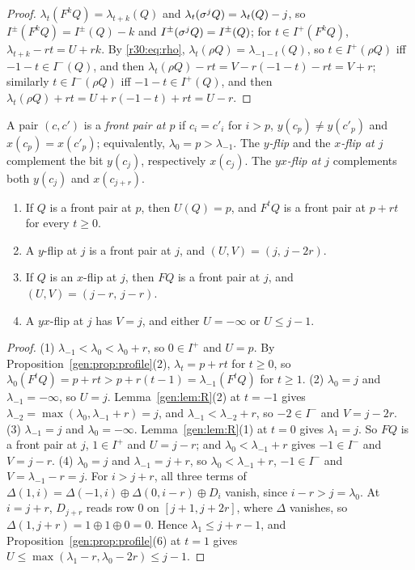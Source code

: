 \begin{proof}
$\lambda_t(F^kQ)=\lambda_{t+k}(Q)$ and $\lambda_t(\sigma^jQ)=\lambda_t(Q)-j$, so $I^\pm(F^kQ)=I^\pm(Q)-k$ and $I^\pm(\sigma^jQ)=I^\pm(Q)$; for $t\in I^+(F^kQ)$, $\lambda_{t+k}-rt=U+rk$. By \eqref{r30:eq:rho}, $\lambda_t(\rho Q)=\lambda_{-1-t}(Q)$, so $t\in I^+(\rho Q)$ iff $-1-t\in I^-(Q)$, and then $\lambda_t(\rho Q)-rt=V-r(-1-t)-rt=V+r$; similarly $t\in I^-(\rho Q)$ iff $-1-t\in I^+(Q)$, and then $\lambda_t(\rho Q)+rt=U+r(-1-t)+rt=U-r$.
\end{proof}

A pair $(c,c')$ is a \emph{front pair at $p$} if $c_i=c'_i$ for $i>p$, $y(c_p)\ne y(c'_p)$ and $x(c_p)=x(c'_p)$; equivalently, $\lambda_0=p>\lambda_{-1}$. The \emph{$y$-flip} and the \emph{$x$-flip at $j$} complement the bit $y(c_j)$, respectively $x(c_j)$. The \emph{$yx$-flip at $j$} complements both $y(c_j)$ and $x(c_{j+r})$.

\begin{lemma}\label{gen:lem:flips}
\begin{enumerate}
\item If $Q$ is a front pair at $p$, then $U(Q)=p$, and $F^tQ$ is a front pair at $p+rt$ for every $t\ge0$.
\item A $y$-flip at $j$ is a front pair at $j$, and $(U,V)=(j,\,j-2r)$.
\item If $Q$ is an $x$-flip at $j$, then $FQ$ is a front pair at $j$, and $(U,V)=(j-r,\,j-r)$.
\item A $yx$-flip at $j$ has $V=j$, and either $U=-\infty$ or $U\le j-1$.
\end{enumerate}
\end{lemma}

\begin{proof}
(1) $\lambda_{-1}<\lambda_0<\lambda_0+r$, so $0\in I^+$ and $U=p$. By Proposition~\ref{gen:prop:profile}(2), $\lambda_t=p+rt$ for $t\ge0$, so $\lambda_0(F^tQ)=p+rt>p+r(t-1)=\lambda_{-1}(F^tQ)$ for $t\ge1$.
(2) $\lambda_0=j$ and $\lambda_{-1}=-\infty$, so $U=j$. Lemma~\ref{gen:lem:R}(2) at $t=-1$ gives $\lambda_{-2}=\max(\lambda_0,\lambda_{-1}+r)=j$, and $\lambda_{-1}<\lambda_{-2}+r$, so $-2\in I^-$ and $V=j-2r$.
(3) $\lambda_{-1}=j$ and $\lambda_0=-\infty$. Lemma~\ref{gen:lem:R}(1) at $t=0$ gives $\lambda_1=j$. So $FQ$ is a front pair at $j$, $1\in I^+$ and $U=j-r$; and $\lambda_0<\lambda_{-1}+r$ gives $-1\in I^-$ and $V=j-r$.
(4) $\lambda_0=j$ and $\lambda_{-1}=j+r$, so $\lambda_0<\lambda_{-1}+r$, $-1\in I^-$ and $V=\lambda_{-1}-r=j$. For $i>j+r$, all three terms of $\Delta(1,i)=\Delta(-1,i)\oplus\Delta(0,i-r)\oplus D_i$ vanish, since $i-r>j=\lambda_0$. At $i=j+r$, $D_{j+r}$ reads row $0$ on $[j+1,j+2r]$, where $\Delta$ vanishes, so $\Delta(1,j+r)=1\oplus1\oplus0=0$. Hence $\lambda_1\le j+r-1$, and Proposition~\ref{gen:prop:profile}(6) at $t=1$ gives $U\le\max(\lambda_1-r,\lambda_0-2r)\le j-1$.
\end{proof}

